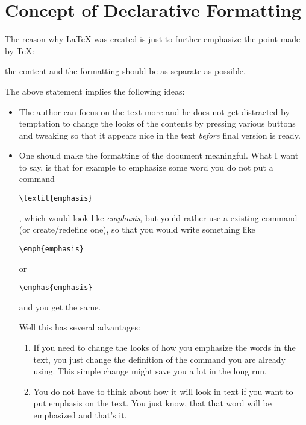 \documentclass[
    draft
    ]{scrartcl}
\renewcommand{\quote}[1]{
\begin{center}
    \colorbox{myyellowl}{
    \begin{minipage}[t]{.92\textwidth}
        #1
    \end{minipage}
    }
\end{center}
}
\begin{document}
\quote{}

\section{Concept of Declarative Formatting}

%
The reason why \LaTeX{} was created is just to further emphasize the point made
    by \TeX{}:
%
\quote{the content and the formatting should be as separate as possible.}

%
The above statement implies the following ideas:
\begin{itemize}
    \item The author can focus on the text more and he does not get distracted
        by temptation to change the looks of the contents by pressing various
        buttons and tweaking so that it appears nice in the text \emph{before}
        final version is ready.

    \item One should make the formatting of the document meaningful. What I want
        to say, is that for example to emphasize some word you do not put a
        command 
\begin{lstlisting}
\textit{emphasis}
\end{lstlisting}
        , which would look like
        \emph{emphasis}, but you'd rather use a existing command (or
        create/redefine one), so that you would write something like
\begin{lstlisting}
\emph{emphasis}
\end{lstlisting}
        or 
\begin{lstlisting}
\emphas{emphasis}
\end{lstlisting}
        and you get the same.

        Well this has several advantages:
        \begin{enumerate}
            \item If you need to change the looks of how you emphasize the words
                in the text, you just change the definition of the command you
                are already using.
                This simple change might save you a lot in the long run.

            \item You do not have to think about how it will look in text if you
                want to put emphasis on the text.
                You just know, that that word will be emphasized and that's it.


\end{enumerate}
\end{itemize}
\end{document}
